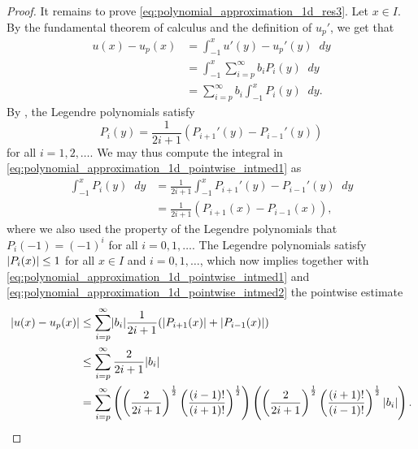 \documentclass[english, 12pt, a4paper, sci, utf8, a-2b, online]{aaltothesis}
\theoremstyle{definition}
\theoremstyle{plain}
\DeclarePairedDelimiter\abs{\lvert}{\rvert}
\newcommand*\diff{\mathop{}\!d}
\numberwithin{equation}{section}
\begin{document}
\begin{proof}
    It remains to prove \eqref{eq:polynomial_approximation_1d_res3}.
    Let $x \in I$. By the fundamental theorem of calculus
    and the definition of $u_p'$, we get that
    \begin{align}
        u(x) - u_p(x)
        &= \int_{-1}^{x} u'(y) - u_p'(y) \diff y \nonumber \\
        &= \int_{-1}^{x} \sum_{i=p}^{\infty} b_i P_i(y) \diff y \nonumber \\
        \label{eq:polynomial_approximation_1d_pointwise_intmed1}
        &= \sum_{i=p}^{\infty} b_i \int_{-1}^{x} P_i(y) \diff y.
    \end{align}
    By \cite[p. 151]{andrews1998}, the Legendre polynomials satisfy
    \begin{equation*}
        P_i(y) = \frac{1}{2i+1} (P_{i+1}'(y) - P_{i-1}'(y))
    \end{equation*}
    for all $i=1,2,\dotsc$. We may thus compute the integral in
    \eqref{eq:polynomial_approximation_1d_pointwise_intmed1} as
    \begin{align}
        \int_{-1}^{x} P_i(y) \diff y
        &= \frac{1}{2i+1} \int_{-1}^{x} P_{i+1}'(y) - P_{i-1}'(y) \diff y \nonumber \\
        \label{eq:polynomial_approximation_1d_pointwise_intmed2}
        &= \frac{1}{2i+1} (P_{i+1}(x) - P_{i-1}(x)),
    \end{align}
    where we also used the property of the Legendre polynomials that
    $P_i(-1) = (-1)^i$ for all $i=0,1,\dotsc$.
    The Legendre polynomials satisfy $\abs{P_i(x)} \leq 1$ for all $x \in I$
    and $i=0,1,\dotsc$, which now implies together with
    \eqref{eq:polynomial_approximation_1d_pointwise_intmed1}
    and \eqref{eq:polynomial_approximation_1d_pointwise_intmed2}
    the pointwise estimate
    \begin{align*}
        \abs{u(x) - u_p(x)}
        &\leq \sum_{i=p}^{\infty} \abs{b_i} \frac{1}{2i+1}
            (\abs{P_{i+1}(x)} + \abs{P_{i-1}(x)}) \\
        &\leq \sum_{i=p}^{\infty} \frac{2}{2i+1} \abs{b_i} \\
        &= \sum_{i=p}^{\infty}
            \left(
                \left( \frac{2}{2i+1} \right)^{\frac{1}{2}}
                \left( \frac{(i-1)!}{(i+1)!} \right)^{\frac{1}{2}}
            \right)
            \left(
                \left( \frac{2}{2i+1} \right)^{\frac{1}{2}}
                \left( \frac{(i+1)!}{(i-1)!} \right)^{\frac{1}{2}}
                \abs{b_i}
            \right).
    \end{align*}

\end{proof}
\end{document}
